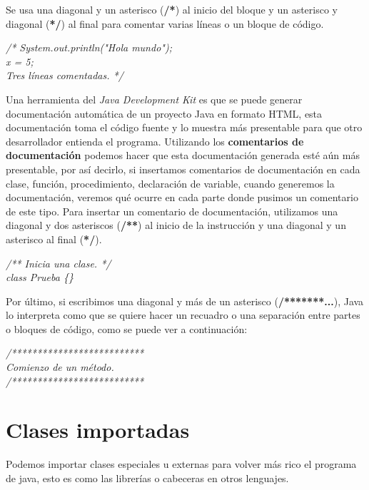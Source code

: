 Se usa una diagonal y un asterisco (\textbf{/*}) al inicio del bloque y un asterisco y diagonal (\textbf{*/}) al final para comentar varias líneas o un bloque de código.
\begin{center}
    \textit{
        /* System.out.println("Hola mundo"); \\
        x = 5; \\
        Tres líneas comentadas. */
    }
\end{center}

Una herramienta del \textit{Java Development Kit} es que se puede generar documentación automática de un proyecto Java en formato HTML, esta documentación toma el código fuente y lo muestra más presentable para que otro desarrollador entienda el programa. Utilizando los \textbf{comentarios de documentación} podemos hacer que esta documentación generada esté aún más presentable, por así decirlo, si insertamos comentarios de documentación en cada clase, función, procedimiento, declaración de variable, cuando generemos la documentación, veremos qué ocurre en cada parte donde pusimos un comentario de este tipo. Para insertar un comentario de documentación, utilizamos una diagonal y dos asteriscos (\textbf{/**}) al inicio de la instrucción y una diagonal y un asterisco al final (\textbf{*/}).
\begin{center}
    \textit{
        /** Inicia una clase. */ \\
        class Prueba \{\}
    }
\end{center}

Por último, si escribimos una diagonal y más de un asterisco (\textbf{/*******...}), Java lo interpreta como que se quiere hacer un recuadro o una separación entre partes o bloques de código, como se puede ver a continuación:
\begin{center}
    \textit{
        /************************** \\
        Comienzo de un método. \\
        /**************************
    }
\end{center}



\section{Clases importadas}
\hspace{0.55cm}Podemos importar clases especiales u externas para volver más rico el programa de java, esto es como las librerías o cabeceras en otros lenguajes.

